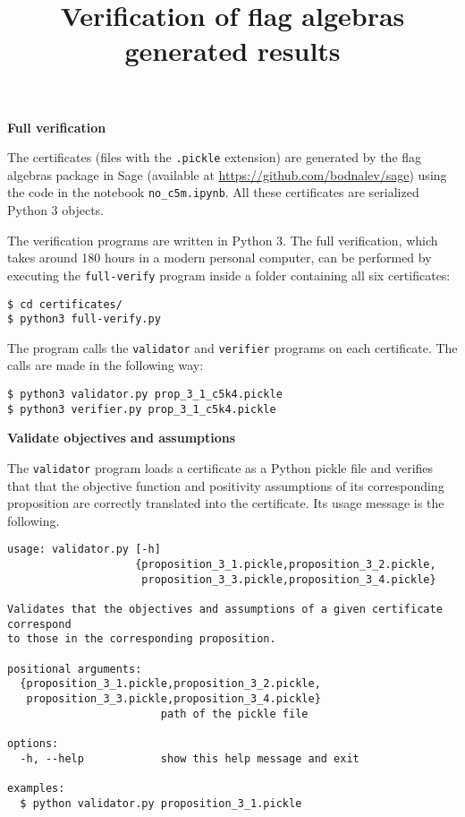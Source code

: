 \documentclass[11pt,a4paper,reqno]{amsart}
\begin{document}
\title[Verification of flag algebras generated results]{Verification of flag algebras generated results}

\maketitle

\textbf{\large Full verification}

The certificates (files with the \verb|.pickle| extension) are generated by the flag
algebras package in Sage (available at
\href{https://github.com/bodnalev/sage}{https://github.com/bodnalev/sage}) using the
code in the notebook \verb|no_c5m.ipynb|. All these certificates are serialized
Python 3 objects.

The verification programs are written in Python 3. The full verification, which takes
around 180 hours in a modern personal computer, can be performed by executing the
\verb|full-verify| program inside a folder containing all six certificates:

\begin{Verbatim}[frame=single, fontsize=\small]
$ cd certificates/
$ python3 full-verify.py
\end{Verbatim}

The program calls the \verb|validator| and \verb|verifier| programs on each
certificate. The calls are made in the following way:

\begin{Verbatim}[frame=single, fontsize=\small]
$ python3 validator.py prop_3_1_c5k4.pickle
$ python3 verifier.py prop_3_1_c5k4.pickle
\end{Verbatim}

\textbf{\large Validate objectives and assumptions}

The \verb|validator| program loads a certificate as a Python pickle file and verifies
that that the objective function and positivity assumptions of its corresponding
proposition are correctly translated into the certificate. Its usage message is the
following.

\begin{Verbatim}[frame=single, fontsize=\small]
usage: validator.py [-h]
                    {proposition_3_1.pickle,proposition_3_2.pickle,
                     proposition_3_3.pickle,proposition_3_4.pickle}

Validates that the objectives and assumptions of a given certificate correspond
to those in the corresponding proposition.

positional arguments:
  {proposition_3_1.pickle,proposition_3_2.pickle,
   proposition_3_3.pickle,proposition_3_4.pickle}
                        path of the pickle file

options:
  -h, --help            show this help message and exit

examples:
  $ python validator.py proposition_3_1.pickle
\end{Verbatim}
\end{document}
